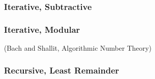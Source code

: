 \documentclass[8pt]{beamer}
\begin{document}
\begin{frame}
\frametitle{Iterative, Subtractive}
\begin{algorithm}[H]
\begin{algorithmic}
\ENDIF
{}
	\ELSE
	\ENDIF
\ENDWHILE

\end{algorithmic}
\end{algorithm}
\end{frame}

\begin{frame}
\frametitle{Iterative, Modular}
\begin{algorithm}[H]
\begin{algorithmic}
\ENDIF
{}
\ENDWHILE
{}
\end{algorithmic}
\end{algorithm}
\indent (Bach and Shallit, Algorithmic Number Theory)
\end{frame}



\begin{frame}
\frametitle{Recursive, Least Remainder}
\begin{algorithm}[H]
\begin{algorithmic}
\ELSE
{}
\ENDIF

\end{algorithmic}
\end{algorithm}
\end{frame}
\end{document}

